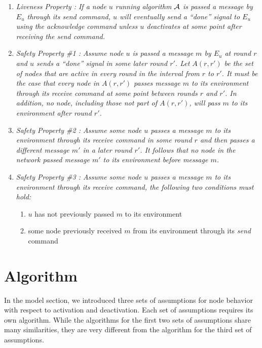 \documentclass[english]{article}
\begin{document}
\begin {enumerate}
 
  \item \em Liveness Property \em: If a node $u$ running algorithm $\cal A$ is passed a message by $E_u$ through its \textit{send} command, $u$ will eventually send  a ``done'' signal to $E_u$ using the \textit{acknowledge} command unless $u$ deactivates at some point after receiving the \textit{send} command.

  \item \em Safety Property \#1 \em: Assume node $u$ is passed a message $m$ by $E_u$ at round $r$ and $u$ sends  a ``done'' signal in some later round $r'$. Let $A(r,r')$ be the set of nodes that are active in every round in the interval from $r$ to $r'$. It must be the case that every node in $A(r,r')$ passes message $m$ to its environment through its \textit{receive} command at some point between rounds $r$ and $r'$. In addition, no node, including those not part of $A(r,r')$, will pass $m$ to its environment after round $r'$. 

  \item \em Safety Property \#2 \em: Assume some node $u$ passes a message $m$ to its environment through its \textit{receive} command in some round $r$ and then passes a different message $m'$ in a later round $r'$. It follows that no node in the network passed message $m'$ to its environment before message $m$. 

  \item \em Safety Property \#3 \em: Assume some node $u$ passes a message $m$ to its environment through its \textit{receive} command, the following two conditions must hold:
  \begin {enumerate}
    \item $u$ has not previously passed $m$ to its environment
    \item some node previously received $m$ from its environment through its \textit{send} command
  \end{enumerate}

\end{enumerate}


\section{Algorithm}

In the model section, we introduced three sets of assumptions for node behavior with respect to activation and deactivation. Each set of assumptions requires its own algorithm. While the algorithms for the first two sets of assumptions share many similarities, they are very different from the algorithm for the third set of assumptions.
\end{document}
